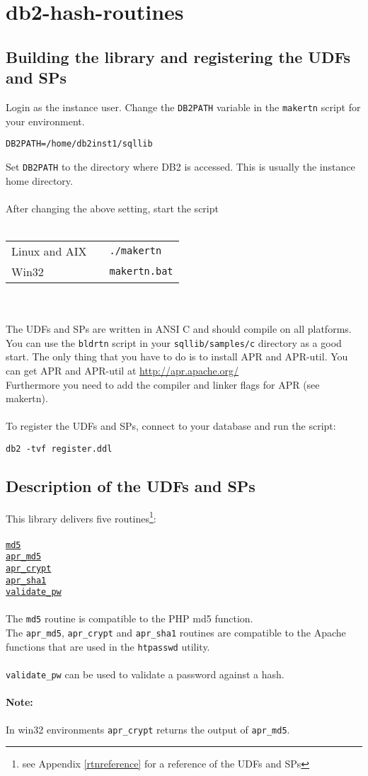 \section{db2-hash-routines}
\subsection{Building the library and registering the UDFs and SPs}
Login as the instance user. Change the {\tt DB2PATH} variable in the {\tt makertn} script for your environment.
\begin{verbatim}
DB2PATH=/home/db2inst1/sqllib
\end{verbatim}
Set {\tt DB2PATH} to the directory where DB2 is accessed. This is usually the instance home directory.\\
\\
After changing the above setting, start the script\\
\\
\begin{tabular}{@{} lll @{}}
Linux and AIX & & {\tt ./makertn}\\
Win32         & & {\tt makertn.bat}\\
\end{tabular}
\\\\
The UDFs and SPs are written in ANSI C and should compile on all platforms.
You can use the {\tt bldrtn} script in your {\tt sqllib/samples/c} directory as a good start.
The only thing that you have to do is to install APR and \mbox{APR-util}.
You can get APR and APR-util at \url{http://apr.apache.org/} \\
Furthermore you need to add the compiler and linker flags for APR (see makertn).\\
\\
To register the UDFs and SPs, connect to your database and run the script:
\begin{verbatim}
db2 -tvf register.ddl
\end{verbatim}
\newpage
\subsection{Description of the UDFs and SPs}
This library delivers five routines\footnote{see Appendix \ref{rtnreference} for a reference of the UDFs and SPs}:\\
\\
\hyperlink{hmd5}{\tt md5}\\
\hyperlink{haprmd5}{\tt apr\_md5}\\
\hyperlink{haprcrypt}{\tt apr\_crypt}\\
\hyperlink{haprsha1}{\tt apr\_sha1}\\
\hyperlink{hvalidatepw}{\tt validate\_pw}\\
\\
The {\tt md5} routine is compatible to the PHP md5 function.\\
The {\tt apr\_md5}, {\tt apr\_crypt} and {\tt apr\_sha1} routines are compatible to the Apache functions that are used in the {\tt htpasswd} utility.\\
\\
{\tt validate\_pw} can be used to validate a password against a hash.
\paragraph{Note:}{In win32 environments {\tt apr\_crypt} returns the output of {\tt apr\_md5}.}
